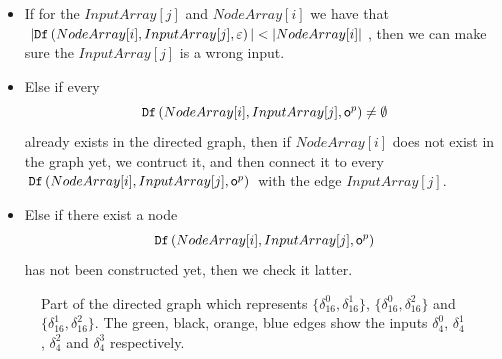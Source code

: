 \begin{itemize}
\begin{itemize}
\item If for the $InputArray[j]$ and $NodeArray[i]$ we have that $|\Ded\left(NodeArray[i],InputArray[j],\varepsilon\right)|<|NodeArray[i]|$, then we can make sure the $InputArray[j]$ is a wrong input.
\item Else if every \[{\tt Df}\left(NodeArray[i],InputArray[j],\mathsf{o}^{p}\right)\ne\emptyset\] already exists in the directed graph, then if $NodeArray[i]$ does not exist in the graph yet, we contruct it, and then connect it to every ${\tt Df}\left(NodeArray[i],InputArray[j],\mathsf{o}^{p}\right)$ with the edge $InputArray[j]$.
\item Else if there exist a node \[{\tt Df}\left(NodeArray[i],InputArray[j],\mathsf{o}^{p}\right)\] has not been constructed yet, then we check it latter. 
\end{itemize} 
\end{itemize} 

\begin{figure}[thpb]
      \centering
      
      \caption{Part of the directed graph which represents $\{\delta_{16}^0,\delta_{16}^1\}$, $\{\delta_{16}^0,\delta_{16}^2\}$ and $\{\delta_{16}^1,\delta_{16}^2\}$. The green, black, orange, blue edges show the inputs $\delta_4^0$, $\delta_4^1$, $\delta_4^2$ and $\delta_4^3$ respectively.}
      \label{fig:4}
   \end{figure}

